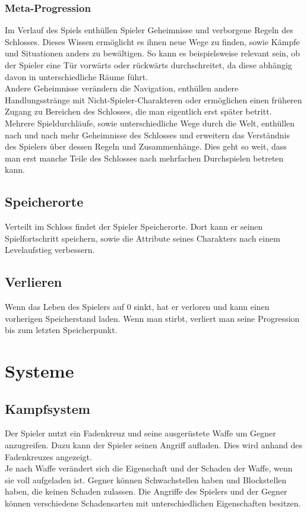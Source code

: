 \documentclass[envcountsame,envcountchap deutsch]{i-studis}
\begin{document}
		\subsection{Meta-Progression}
		Im Verlauf des Spiels enthüllen Spieler Geheimnisse und verborgene Regeln des Schlosses.
		Dieses Wissen ermöglicht es ihnen neue Wege zu finden, sowie Kämpfe und Situationen anders zu
		bewältigen. 
		So kann es beispielsweise relevant sein, ob der Spieler eine Tür vorwärts oder rückwärts durchschreitet, da
		diese abhängig davon in unterschiedliche Räume führt. 
		\\Andere Geheimnisse verändern die Navigation,
		enthüllen andere Handlungsstränge mit Nicht-Spieler-Charakteren oder ermöglichen einen früheren Zugang
		zu Bereichen des Schlosses, die man eigentlich erst später betritt.
		Mehrere Spieldurchläufe, sowie unterschiedliche Wege durch die Welt, enthüllen nach und nach mehr
		Geheimnisse des Schlosses und erweitern das Verständnis des Spielers über dessen Regeln und
		Zusammenhänge.
		 Dies geht so weit, dass man erst manche Teile des Schlosses nach mehrfachen
		Durchspielen betreten kann.
	\section{Speicherorte}
	Verteilt im Schloss findet der Spieler Speicherorte. Dort kann er seinen Spielfortschritt speichern, sowie die
	Attribute seines Charakters nach einem Levelaufstieg verbessern.
	\section{Verlieren}
	Wenn das Leben des Spielers auf 0 sinkt, hat er verloren und kann einen vorherigen Speicherstand laden.
	Wenn man stirbt, verliert man seine Progression bis zum letzten Speicherpunkt. 
\chapter{Systeme}
	\section{Kampfsystem}
	Der Spieler nutzt ein Fadenkreuz und seine ausgerüstete Waffe um Gegner anzugreifen. Dazu kann der
	Spieler seinen Angriff aufladen. Dies wird anhand des Fadenkreuzes angezeigt.
	\\ Je nach Waffe verändert sich
	die Eigenschaft und der Schaden der Waffe, wenn sie voll aufgeladen ist. Gegner können Schwachstellen
	haben und Blockstellen haben, die keinen Schaden zulassen.
	Die Angriffe des Spielers und der Gegner können verschiedene Schadensarten mit unterschiedlichen
	Eigenschaften besitzen. 
\end{document}
